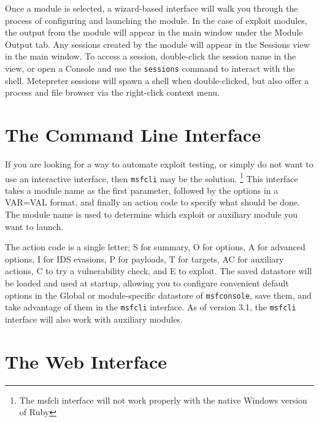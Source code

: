 \documentclass{report}
\begin{document}
\par
Once a module is selected, a wizard-based interface will walk you through the process of
configuring and launching the module. In the case of exploit modules, the output from
the module will appear in the main window under the Module Output tab. Any sessions created
by the module will appear in the Sessions view in the main window. To access a session,
double-click the session name in the view, or open a Console and use the \texttt{sessions}
command to interact with the shell. Metepreter sessions will spawn a shell when double-clicked,
but also offer a process and file browser via the right-click context menu. 


    \section{The Command Line Interface}
    \label{STARTED-CLI}

\par
If you are looking for a way to automate exploit testing, or simply do not want
to use an interactive interface, then \texttt{msfcli} may be the solution.
\footnote{The msfcli interface will not work properly with the native Windows version of Ruby}
This interface takes a module name as the first parameter, followed by the options
in a VAR=VAL format, and finally an action code to specify what should be done.
The module name is used to determine which exploit or auxiliary module you
want to launch.

\par
The action code is a single letter; S for summary, O for options, A for advanced
options, I for IDS evasions, P for payloads, T for targets, AC for auxiliary
actions, C to try a vulnerability check, and E to exploit. The saved
datastore will be loaded and used at startup, allowing you to configure
convenient default options in the Global or module-specific datastore of
\texttt{msfconsole}, save them, and take advantage of them in the
\texttt{msfcli} interface. As of version 3.1, the \texttt{msfcli} interface
will also work with auxiliary modules.

    \section{The Web Interface}
    \label{STARTED-WEB}
\end{document}
